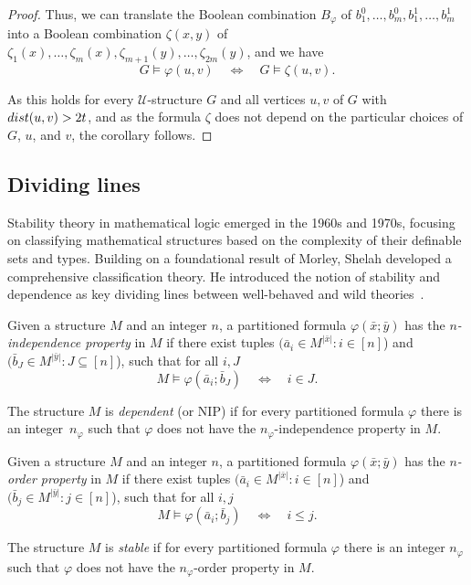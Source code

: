 \documentclass{lmcs}
\newcommand\xbar{\bar{x}}
\renewcommand{\phi}{\varphi}
\theoremstyle{definition}
\begin{document}
\begin{exa}
\begin{proof}
	Thus, we can translate the Boolean combination $B_\phi$ of $b_1^0,\dots,b_m^0,b_1^1,\dots,b_m^1$ into a Boolean combination $\zeta(x,y)$ of $\zeta_1(x),\dots,\zeta_m(x),\zeta_{m+1}(y),\dots,\zeta_{2m}(y)$, and we have
	\[
	G\models \phi(u,v)\quad\iff\quad G\models\zeta(u,v).
	\]	

 As this holds for every $\mathcal U$-structure $G$ and all vertices $u,v$ of $G$ with ${\rm dist}(u,v)>2t$, and as the formula $\zeta$ does not depend on the particular choices of  $G$, $u$, and $v$, the corollary follows.
\end{proof}

\end{exa}
\subsection{Dividing lines}\label{sec:dividing-lines}
Stability theory in mathematical logic emerged in the 1960s and 1970s, focusing on classifying mathematical structures based on the complexity of their definable sets and types. 
Building on a foundational result of Morley,  Shelah developed a comprehensive classification theory. 
He introduced the notion of stability and dependence as key dividing lines between well-behaved and wild theories~\cite{shelah1990classification}. 

\begin{defi}
	Given a structure $M$ and an integer $n$, a partitioned formula $\phi(\xbar;\bar y)$ has the {\em $n$-independence property} in $M$ if there exist tuples $(\bar a_i\in M^{|\bar x|} : i\in [n]$) and 
	$(\bar b_J\in M^{|\bar y|} : J\subseteq [n]$), such that for all $i, J$
	\begin{equation}
		M\models\phi(\bar a_i;\bar b_J)\quad\iff\quad i\in J.
	\end{equation}

	The structure $M$ is {\em dependent} (or NIP) if for every partitioned formula $\phi$ there is an integer~$n_\phi$ such that $\phi$ does not have the $n_\phi$-independence property in $M$.
\end{defi}

\begin{defi}
	Given a structure $M$ and an integer $n$, a partitioned formula $\phi(\xbar;\bar y)$ has the \emph{$n$-order property} in $M$ if there exist tuples $(\bar a_i\in M^{|\bar x|} : i\in [n]$) and 
	 $(\bar b_j\in M^{|\bar y|} : j\in [n]$), such that for all $i, j$
	 \begin{equation}
	 	M\models\phi(\bar a_i;\bar b_j)\quad\iff\quad i\leq j.
	 \end{equation}

	 The structure $M$ is {\em stable} if for every partitioned formula $\phi$ there is an integer $n_\phi$ such that $\phi$ does not have the $n_\phi$-order property in $M$.
\end{defi}
\end{document}
